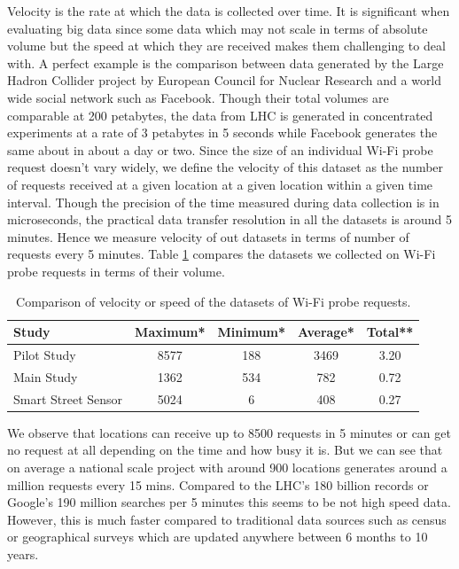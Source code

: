 Velocity is the rate at which the data is collected over time.
It is significant when evaluating big data since some data which may not scale in terms of absolute volume but the speed at which they are received makes them challenging to deal with.
A perfect example is the comparison between data generated by the Large Hadron Collider project by European Council for Nuclear Research and a world wide social network such as Facebook.
Though their total volumes are comparable at 200 petabytes, the data from LHC is generated in concentrated experiments at a rate of 3 petabytes in 5 seconds while Facebook generates the same about in about a day or two.
Since the size of an individual Wi-Fi probe request doesn't vary widely, we define the velocity of this dataset as the number of requests received at a given location at a given location within a given time interval.
Though the precision of the time measured during data collection is in microseconds, the practical data transfer resolution in all the datasets is around 5 minutes.
Hence we measure velocity of out datasets in terms of number of requests every 5 minutes.
Table \ref{table:toolkit:velocity} compares the datasets we collected on Wi-Fi probe requests in terms of their volume.

\begin{table}[h]
  \footnotesize
  \begin{center}
    \begin{tabular}{lcccc}
      \toprule
      Study & Maximum* & Minimum* & Average* & Total** \\
      \midrule
      Pilot Study & 8577 & 188 & 3469 & 3.20 \\
      Main Study & 1362 & 534 & 782 & 0.72 \\
      Smart Street Sensor & 5024 & 6 & 408 & 0.27 \\
      \bottomrule
    \end{tabular}
  \end{center}
  \caption{Comparison of velocity or speed of the datasets of Wi-Fi probe requests.}
  \label{table:toolkit:velocity}
\end{table}


We observe that locations can receive up to 8500 requests in 5 minutes or can get no request at all depending on the time and how busy it is.
But we can see that on average a national scale project with around 900 locations generates around a million requests every 15 mins. 
Compared to the LHC's 180 billion records or Google's 190 million searches per 5 minutes this seems to be not high speed data.
However, this is much faster compared to traditional data sources such as census or geographical surveys which are updated anywhere between 6 months to 10 years.

